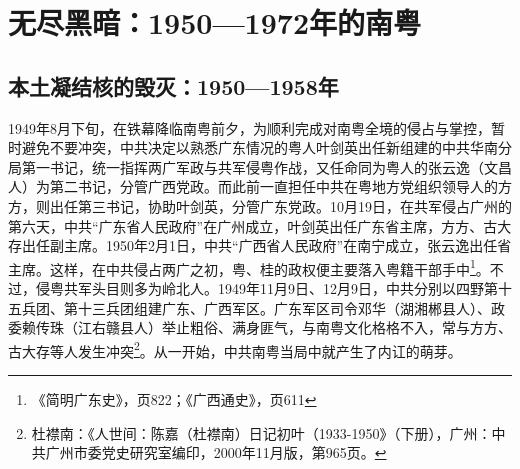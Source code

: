 \chapter{无尽黑暗：1950—1972年的南粤}

\section{本土凝结核的毁灭：1950—1958年}

1949年8月下旬，在铁幕降临南粤前夕，为顺利完成对南粤全境的侵占与掌控，暂时避免不要冲突，中共决定以熟悉广东情况的粤人叶剑英出任新组建的中共华南分局第一书记，统一指挥两广军政与共军侵粤作战，又任命同为粤人的张云逸（文昌人）为第二书记，分管广西党政。而此前一直担任中共在粤地方党组织领导人的方方，则出任第三书记，协助叶剑英，分管广东党政。10月19日，在共军侵占广州的第六天，中共“广东省人民政府”在广州成立，叶剑英出任广东省主席，方方、古大存出任副主席。1950年2月1日，中共“广西省人民政府”在南宁成立，张云逸出任省主席。这样，在中共侵占两广之初，粤、桂的政权便主要落入粤籍干部手中\footnote{《简明广东史》，页822；《广西通史》，页611}。不过，侵粤共军头目则多为岭北人。1949年11月9日、12月9日，中共分别以四野第十五兵团、第十三兵团组建广东、广西军区。广东军区司令邓华（湖湘郴县人）、政委赖传珠（江右赣县人）举止粗俗、满身匪气，与南粤文化格格不入，常与方方、古大存等人发生冲突\footnote{杜襟南：《人世间：陈嘉（杜襟南）日记初叶（1933-1950》（下册），广州：中共广州市委党史研究室编印，2000年11月版，第965页。}。从一开始，中共南粤当局中就产生了内讧的萌芽。


